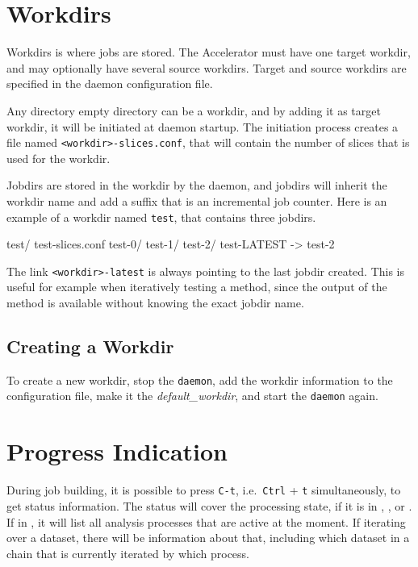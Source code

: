 \clearpage

\section{Workdirs}
Workdirs is where jobs are stored.  The Accelerator must have one
target workdir, and may optionally have several source workdirs.
Target and source workdirs are specified in the daemon configuration
file.

Any directory empty directory can be a workdir, and by adding it as
target workdir, it will be initiated at daemon startup.  The
initiation process creates a file named
\texttt{<workdir>-slices.conf}, that will contain the number
of slices that is used for the workdir.

Jobdirs are stored in the workdir by the daemon, and jobdirs will
inherit the workdir name and add a suffix that is an incremental job
counter.  Here is an example of a workdir named \texttt{test}, that
contains three jobdirs.
\begin{shell}
test/
    test-slices.conf
    test-0/
    test-1/
    test-2/
    test-LATEST -> test-2
\end{shell}
The link \texttt{<workdir>-latest} is always pointing to the last
jobdir created.  This is useful for example when iteratively testing a
method, since the output of the method is available without knowing
the exact jobdir name.


\subsection{Creating a Workdir}
To create a new workdir, stop the \texttt{daemon}, add the workdir
information to the configuration file, make it
the \textsl{default\_workdir}, and start the \texttt{daemon} again.



\clearpage

\section{Progress Indication}

During job building, it is possible to press \texttt{C-t},
i.e.\ \texttt{Ctrl} + \texttt{t} simultaneously, to get status
information.  The status will cover the processing state, if it is
in \prepare, \analysis, or \synthesis.  If in \analysis, it will list
all analysis processes that are active at the moment.  If iterating
over a dataset, there will be information about that, including which
dataset in a chain that is currently iterated by which \analysis
process.

